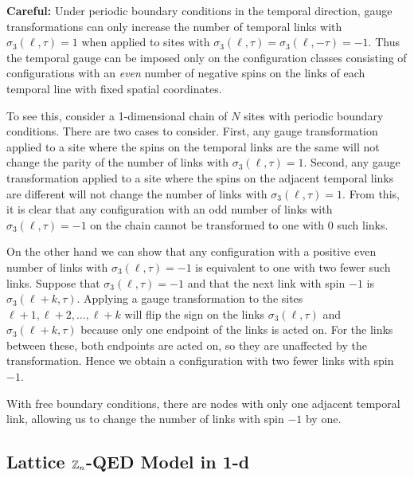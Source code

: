 \documentclass[11pt,reqno]{amsart}
\numberwithin{equation}{section}
\begin{document}
	
	\textbf{Careful:} Under periodic boundary conditions in the temporal direction, gauge transformations can only increase the number of temporal links with $\sigma_3(\ell,\tau)=1$ when applied to sites with $\sigma_3(\ell,\tau)=\sigma_3(\ell,-\tau)=-1$.
	Thus the temporal gauge can be imposed only on the configuration classes consisting of configurations with an \emph{even} number of negative spins on the links of each temporal line with fixed spatial coordinates.
	
	To see this, consider a 1-dimensional chain of $N$ sites with periodic boundary conditions. 
	There are two cases to consider.
	First, any gauge transformation applied to a site where the spins on the temporal links are the same will not change the parity of the number of links with $\sigma_3(\ell,\tau)=1$.
	Second, any gauge transformation applied to a site where the spins on the adjacent temporal links are different will not change the number of links with $\sigma_3(\ell,\tau)=1$.
	From this, it is clear that any configuration with an odd number of links with $\sigma_3(\ell,\tau)=-1$ on the chain cannot be transformed to one with 0 such links.
	
	On the other hand we can show that any configuration with a positive even number of links with $\sigma_3(\ell,\tau)=-1$ is equivalent to one with two fewer such links.
	Suppose that $\sigma_3(\ell,\tau)=-1$ and that the next link with spin $-1$ is $\sigma_3(\ell+k,\tau)$.
	Applying a gauge transformation to the sites $\ell+1,\ell+2,\ldots, \ell+k$ will flip the sign on the links $\sigma_3(\ell,\tau)$ and $\sigma_3(\ell+k,\tau)$ because only one endpoint of the links is acted on.
	For the links between these, both endpoints are acted on, so they are unaffected by the transformation.
	Hence we obtain a configuration with two fewer links with spin $-1$.
	
	With free boundary conditions, there are nodes with only one adjacent temporal link, allowing us to change the number of links with spin $-1$ by one. \\
	
	
	\subsection{Lattice $\mathbb{Z}_n$-QED Model in 1-d}
	
\end{document}
